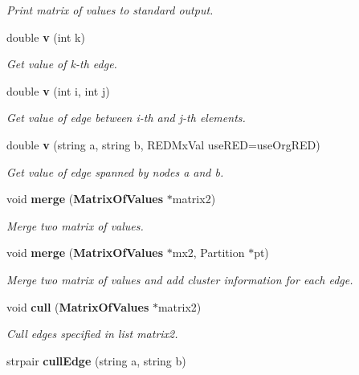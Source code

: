 \begin{CompactItemize}
\begin{CompactList}\small\item\em Print matrix of values to standard output. \item\end{CompactList}\item 
double {\bf v} (int k)\label{classMatrixOfValues_a15}

\begin{CompactList}\small\item\em Get value of k-th edge. \item\end{CompactList}\item 
double {\bf v} (int i, int j)\label{classMatrixOfValues_a16}

\begin{CompactList}\small\item\em Get value of edge between i-th and j-th elements. \item\end{CompactList}\item 
double {\bf v} (string a, string b, REDMx\-Val use\-RED=use\-Org\-RED)
\begin{CompactList}\small\item\em Get value of edge spanned by nodes a and b. \item\end{CompactList}\item 
void {\bf merge} ({\bf Matrix\-Of\-Values} $\ast$matrix2)\label{classMatrixOfValues_a18}

\begin{CompactList}\small\item\em Merge two matrix of values. \item\end{CompactList}\item 
void {\bf merge} ({\bf Matrix\-Of\-Values} $\ast$mx2, Partition $\ast$pt)
\begin{CompactList}\small\item\em Merge two matrix of values and add cluster information for each edge. \item\end{CompactList}\item 
void {\bf cull} ({\bf Matrix\-Of\-Values} $\ast$matrix2)\label{classMatrixOfValues_a20}

\begin{CompactList}\small\item\em Cull edges specified in list matrix2. \item\end{CompactList}\item 
strpair {\bf cull\-Edge} (string a, string b)\label{classMatrixOfValues_a21}


\end{CompactItemize}
